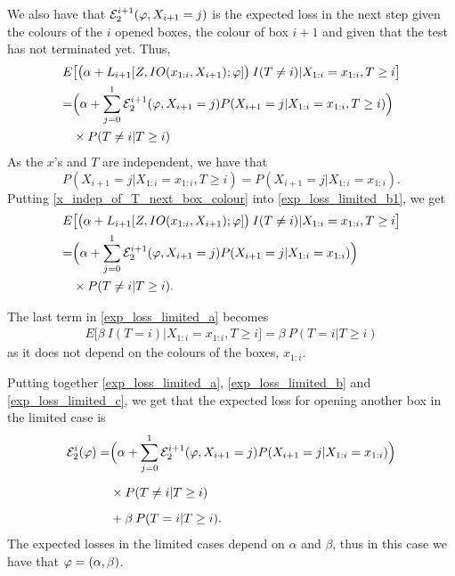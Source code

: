 We also have that $\mathcal{E}^{i+1}_{2}(\varphi,X_{i+1}=j)$ is the expected loss in the next step given the colours of the $i$ opened boxes,  the colour of box $i+1$ and given that the test has not terminated yet. Thus,
\begin{equation}
\label{exp_loss_limited_b1}
    \begin{aligned}
        E&\big[\big( \alpha + L_{i+1}[Z,IO(x_{1:i},X_{i+1});\varphi] \big) \: I(T\neq i) |X_{1:i}= x_{1:i}, T\geq i \big] \\
        =& \Big( \alpha + \sum_{j=0}^1 \mathcal{E}^{i+1}_{2}(\varphi,X_{i+1}=j) P(X_{i+1}=j|X_{1:i}=x_{1:i},T\geq i) \Big)\\
        &\times P(T \neq i|T\geq i)
    \end{aligned}
\end{equation}
As the $x$'s and $T$ are independent, we have that
\begin{equation}
\label{x_indep_of_T_next_box_colour}
    P(X_{i+1}=j|X_{1:i}=x_{1:i},T\geq i) = P(X_{i+1}=j|X_{1:i}=x_{1:i}).
\end{equation}
Putting \eqref{x_indep_of_T_next_box_colour} into \eqref{exp_loss_limited_b1}, we get
\begin{equation}
\label{exp_loss_limited_b}
    \begin{aligned}
        E&\big[\big( \alpha + L_{i+1}[Z,IO(x_{1:i},X_{i+1});\varphi] \big) \: I(T\neq i) |X_{1:i}= x_{1:i}, T\geq i \big] \\
        =& \Big( \alpha + \sum_{j=0}^1 \mathcal{E}^{i+1}_{2}(\varphi,X_{i+1}=j) P(X_{i+1}=j|X_{1:i}=x_{1:i}) \Big)\\
        &\times P(T \neq i|T\geq i).
    \end{aligned}
\end{equation}

The last term in \eqref{exp_loss_limited_a} becomes
\begin{equation}
\label{exp_loss_limited_c}
    \begin{aligned}
        E\big[ \beta \: I(T=i)|X_{1:i}=x_{1:i}, T\geq i\big] 
        = \beta \: P(T=i|T\geq i)
    \end{aligned}
\end{equation}
as it does not depend on the colours of the boxes, $x_{1:i}$.

Putting together \eqref{exp_loss_limited_a}, \eqref{exp_loss_limited_b} and \eqref{exp_loss_limited_c}, we get that the expected loss for opening another box in the limited case is
\begin{equation}
\label{exp_loss_limited_final}
    \begin{aligned}
        \mathcal{E}^i_{2}(\varphi) 
        =& \Big( \alpha + \sum_{j=0}^1 \mathcal{E}^{i+1}_{2}(\varphi,X_{i+1}=j) P(X_{i+1}=j|X_{1:i}=x_{1:i}) \Big) \\[6pt]
        &\times 
        P(T \neq i|T\geq i)\\[6pt]
        &+ \beta \: P(T=i|T\geq i).
    \end{aligned}
\end{equation}
The expected losses in the limited cases depend on $\alpha$ and $\beta$, thus in this case we have that $\varphi = (\alpha,\beta)$.

